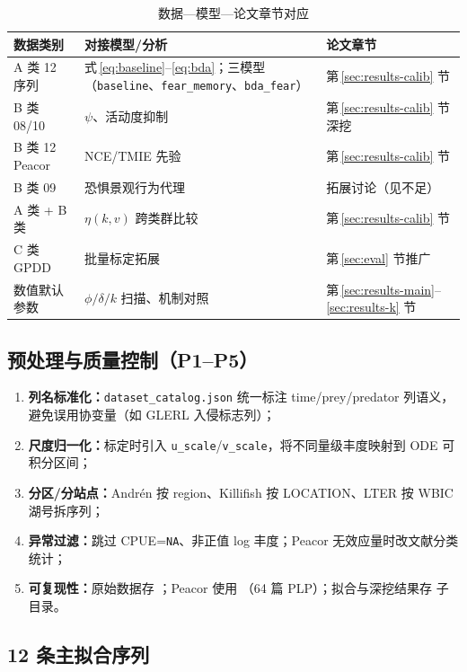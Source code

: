 \documentclass[12pt,a4paper]{ctexart}
\newcommand{\modeltrio}{三模型（\texttt{baseline}、\texttt{fear\_memory}、\texttt{bda\_fear}）}
\begin{document}
\begin{table}[H]
  \centering
  \caption{数据—模型—论文章节对应}
  \label{tab:data-model-sec}
  \footnotesize
  \begin{tabular}{lll}
    \toprule
    数据类别 & 对接模型/分析 & 论文章节 \\
    \midrule
    A 类 12 序列 & 式\,\eqref{eq:baseline}--\eqref{eq:bda}；\modeltrio{} &
    第\,\ref{sec:results-calib} 节 \\
    B 类 08/10 & $\psi$、活动度抑制 & 第\,\ref{sec:results-calib} 节深挖 \\
    B 类 12 Peacor & NCE/TMIE 先验 & 第\,\ref{sec:results-calib} 节 \\
    B 类 09 & 恐惧景观行为代理 & 拓展讨论（见不足） \\
    A 类 + B 类 & $\eta(k,v)$ 跨类群比较 & 第\,\ref{sec:results-calib} 节 \\
    C 类 GPDD & 批量标定拓展 & 第\,\ref{sec:eval} 节推广 \\
    数值默认参数 & $\phi/\delta/k$ 扫描、机制对照 & 第\,\ref{sec:results-main}--\ref{sec:results-k} 节 \\
    \bottomrule
  \end{tabular}
\end{table}

\subsection{预处理与质量控制（P1--P5）}

\begin{enumerate}[label=\textbf{P\arabic*：},leftmargin=2em]
  \item \textbf{列名标准化：}\texttt{dataset\_catalog.json} 统一标注 time/prey/predator 列语义，避免误用协变量（如 GLERL 入侵标志列）；
  \item \textbf{尺度归一化：}标定时引入 \texttt{u\_scale}/\texttt{v\_scale}，将不同量级丰度映射到 ODE 可积分区间；
  \item \textbf{分区/分站点：}Andrén 按 region、Killifish 按 LOCATION、LTER 按 WBIC 湖号拆序列；
  \item \textbf{异常过滤：}跳过 CPUE=\texttt{NA}、非正值 log 丰度；Peacor 无效应量时改文献分类统计；
  \item \textbf{可复现性：}原始数据存 ；Peacor 使用 （64 篇 PLP）；拟合与深挖结果存  子目录。
\end{enumerate}

\subsection{12 条主拟合序列}
\end{document}
